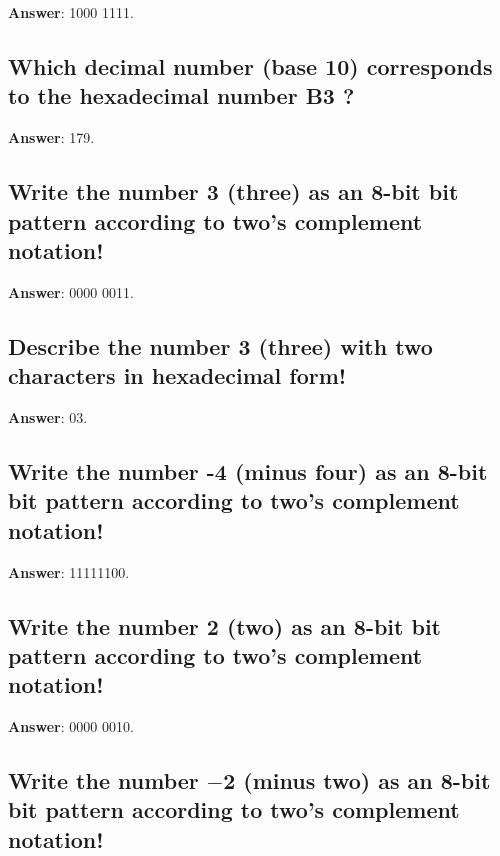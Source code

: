 \documentclass[a4paper,11pt,oneside]{article}
\begin{document}
\begin{sloppypar}
\label{q:364:sa:en:True}

\textbf{Answer}: 1000 1111.



\subsection{Which decimal number (base 10) corresponds to the hexadecimal number  B3 ?}

\label{q:365:sa:en:True}

\textbf{Answer}: 179.



\subsection{Write the number 3 (three) as an 8-bit bit pattern according to two's complement notation!}

\label{q:366:sa:en:True}

\textbf{Answer}: 0000 0011.



\subsection{Describe the number 3 (three) with two characters in hexadecimal form!}

\label{q:367:sa:en:True}

\textbf{Answer}: 03.



\subsection{Write the number -4 (minus four) as an 8-bit bit pattern according to two's complement notation!}

\label{q:368:sa:en:True}

\textbf{Answer}: 11111100.



\subsection{Write the number 2 (two) as an 8-bit bit pattern according to two's complement notation!}

\label{q:369:sa:en:True}

\textbf{Answer}: 0000 0010.



\subsection{Write the number \ensuremath{-}2 (minus two) as an 8-bit bit pattern according to two's complement notation!}


\end{sloppypar}
\end{document}

